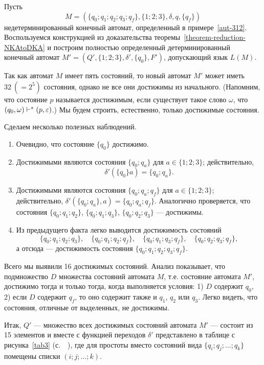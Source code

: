 \begin{myexample}
\label{example-NKAtoDKA-321}\label{aut-313}
Пусть
\[
M=(\{q_0;q_1;q_2;q_3;q_f\},\{1;2;3\},\delta,q,\{q_f\})
\]
недетерминированный конечный автомат, определенный в примере~\ref{aut-312}. Воспользуемся конструкцией из доказательства теоремы~\ref{theorem-reduction-NKAtoDKA} и построим полностью определенный детерминированный конечный автомат $M'=(Q',\{1;2;3\},\delta',\{q_0\},F')$, допускающий язык $L(M)$.

Так как автомат $M$ имеет пять состояний, то новый автомат $M'$ может иметь $32~(=2^5)$ состояния, однако не все они достижимы из начального. (Напомним, что состояние $p$ называется достижимым, если существует такое слово $\omega$, что $(q_0,\omega)\vdash^*(p,\varepsilon)$.) Мы будем строить, естественно, только достижимые состояния.

Сделаем несколько полезных наблюдений.
\begin{enumerate}
    \item Очевидно, что состояние $\{q_0\}$ достижимо.

    \item Достижимыми являются состояния $\{q_0;q_a\}$ для
    $a\in \{1;2;3\}$; действительно,
    \[
        \delta'(\{q_0\}a)=\{q_0;q_a\}.
    \]

    \item Достижимыми являются состояния $\{q_0;q_a;q_f\}$ для $a\in\{1;2;3\}$; действительно, $\delta'(\{q_0;q_a\},a)=\{q_0;q_a;q_f\}$. Аналогично проверяется, что состояния $\{q_0;q_1;q_2\}$, $\{q_0;q_1;q_3\}$, $\{q_0;q_2;q_3\}$ --- достижимы.

    \item Из предыдущего факта легко выводится достижимость состояний
    \[
        \{q_0;q_1;q_2;q_3\}, \quad \{q_0;q_1;q_2;q_f\}, \quad
        \{q_0;q_1;q_3;q_f\}, \quad \{q_0;q_2;q_3;q_f\},
    \]
    а отсюда --- достижимость состояния $\{q_0;q_1;q_2;q_3;q_f\}$.
\end{enumerate}

Всего мы выявили 16 достижимых состояний. Анализ показывает, что подмножество $D$ множества состояний автомата $M$, т.е. состояние автомата $M'$, достижимо тогда и только тогда, когда выполняется условия: 1) $D$ содержит $q_0$, 2) если $D$ содержит $q_f$, то оно содержит также и $q_1$, $q_2$ или $q_3$. Легко видеть, что состояния, отличные от выделенных, не достижимы.

Итак, $Q'$ --- множество всех достижимых состояний автомата $M'$ --- состоит из 15 элементов и вместе с функцией переходов $\delta'$ представлено в таблице с рисунка~\ref{tab3} (с.~~\pageref{tab3}), где для простоты вместо состояний вида $\{q_i;q_j;\ldots ;q_k\}$ помещены списки $(i;j;\ldots ;k)$.


\end{myexample}
